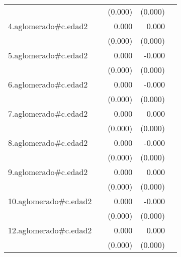 {\begin{longtable}{l*{4}{D{.}{.}{-1}}}
            &                     &     (0.000)         &     (0.000)         &                     \\
\addlinespace
4.aglomerado#c.edad2&                     &       0.000\sym{**} &       0.000         &                     \\
            &                     &     (0.000)         &     (0.000)         &                     \\
\addlinespace
5.aglomerado#c.edad2&                     &       0.000         &      -0.000         &                     \\
            &                     &     (0.000)         &     (0.000)         &                     \\
\addlinespace
6.aglomerado#c.edad2&                     &       0.000         &      -0.000         &                     \\
            &                     &     (0.000)         &     (0.000)         &                     \\
\addlinespace
7.aglomerado#c.edad2&                     &       0.000         &       0.000         &                     \\
            &                     &     (0.000)         &     (0.000)         &                     \\
\addlinespace
8.aglomerado#c.edad2&                     &       0.000         &      -0.000         &                     \\
            &                     &     (0.000)         &     (0.000)         &                     \\
\addlinespace
9.aglomerado#c.edad2&                     &       0.000         &       0.000         &                     \\
            &                     &     (0.000)         &     (0.000)         &                     \\
\addlinespace
10.aglomerado#c.edad2&                     &       0.000\sym{*}  &      -0.000         &                     \\
            &                     &     (0.000)         &     (0.000)         &                     \\
\addlinespace
12.aglomerado#c.edad2&                     &       0.000\sym{*}  &       0.000         &                     \\
            &                     &     (0.000)         &     (0.000)         &                     \\

\end{longtable}}
